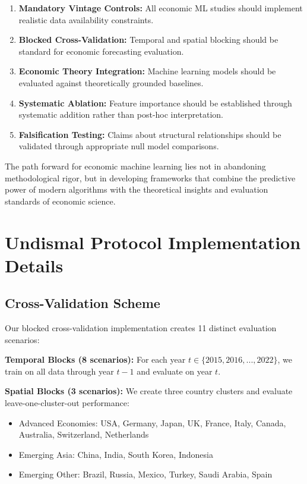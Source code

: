 \documentclass[11pt,a4paper]{article}
\begin{document}
\begin{enumerate}
\item \textbf{Mandatory Vintage Controls:} All economic ML studies should implement realistic data availability constraints.
\item \textbf{Blocked Cross-Validation:} Temporal and spatial blocking should be standard for economic forecasting evaluation.
\item \textbf{Economic Theory Integration:} Machine learning models should be evaluated against theoretically grounded baselines.
\item \textbf{Systematic Ablation:} Feature importance should be established through systematic addition rather than post-hoc interpretation.
\item \textbf{Falsification Testing:} Claims about structural relationships should be validated through appropriate null model comparisons.
\end{enumerate}

The path forward for economic machine learning lies not in abandoning methodological rigor, but in developing frameworks that combine the predictive power of modern algorithms with the theoretical insights and evaluation standards of economic science.




\clearpage
\appendix

\section{Undismal Protocol Implementation Details}

\subsection{Cross-Validation Scheme}

Our blocked cross-validation implementation creates 11 distinct evaluation scenarios:

\textbf{Temporal Blocks (8 scenarios):} For each year $t \in \{2015, 2016, ..., 2022\}$, we train on all data through year $t-1$ and evaluate on year $t$.

\textbf{Spatial Blocks (3 scenarios):} We create three country clusters and evaluate leave-one-cluster-out performance:
\begin{itemize}
\item Advanced Economies: USA, Germany, Japan, UK, France, Italy, Canada, Australia, Switzerland, Netherlands
\item Emerging Asia: China, India, South Korea, Indonesia
\item Emerging Other: Brazil, Russia, Mexico, Turkey, Saudi Arabia, Spain
\end{itemize}
\end{document}
